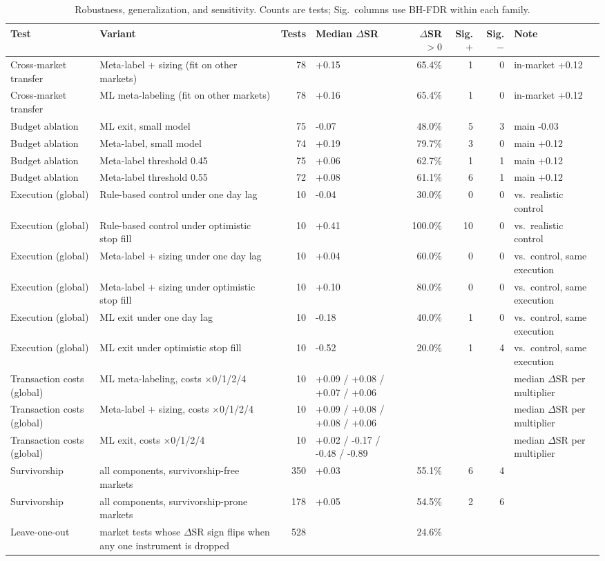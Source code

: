 \begin{longtable}{p{2.4cm} p{4.2cm} r l r r r p{2.4cm}}
\caption{Robustness, generalization, and sensitivity. Counts are tests; Sig.\ columns use BH-FDR within each family.} \label{tab:s2robust} \\
\toprule
Test & Variant & Tests & Median $\Delta$SR & $\Delta$SR$>0$ & Sig.$+$ & Sig.$-$ & Note \\
\midrule
\endhead
\bottomrule
\endfoot
Cross-market transfer & Meta-label + sizing (fit on other markets) & 78 & +0.15 & 65.4\% & 1 & 0 & in-market +0.12 \\
Cross-market transfer & ML meta-labeling (fit on other markets) & 78 & +0.16 & 65.4\% & 1 & 0 & in-market +0.12 \\
Budget ablation & ML exit, small model & 75 & -0.07 & 48.0\% & 5 & 3 & main -0.03 \\
Budget ablation & Meta-label, small model & 74 & +0.19 & 79.7\% & 3 & 0 & main +0.12 \\
Budget ablation & Meta-label threshold 0.45 & 75 & +0.06 & 62.7\% & 1 & 1 & main +0.12 \\
Budget ablation & Meta-label threshold 0.55 & 72 & +0.08 & 61.1\% & 6 & 1 & main +0.12 \\
Execution (global) & Rule-based control under one day lag & 10 & -0.04 & 30.0\% & 0 & 0 & vs.\ realistic control \\
Execution (global) & Rule-based control under optimistic stop fill & 10 & +0.41 & 100.0\% & 10 & 0 & vs.\ realistic control \\
Execution (global) & Meta-label + sizing under one day lag & 10 & +0.04 & 60.0\% & 0 & 0 & vs.\ control, same execution \\
Execution (global) & Meta-label + sizing under optimistic stop fill & 10 & +0.10 & 80.0\% & 0 & 0 & vs.\ control, same execution \\
Execution (global) & ML exit under one day lag & 10 & -0.18 & 40.0\% & 1 & 0 & vs.\ control, same execution \\
Execution (global) & ML exit under optimistic stop fill & 10 & -0.52 & 20.0\% & 1 & 4 & vs.\ control, same execution \\
Transaction costs (global) & ML meta-labeling, costs $\times$0/1/2/4 & 10 & +0.09 / +0.08 / +0.07 / +0.06 &  &  &  & median $\Delta$SR per multiplier \\
Transaction costs (global) & Meta-label + sizing, costs $\times$0/1/2/4 & 10 & +0.09 / +0.08 / +0.08 / +0.06 &  &  &  & median $\Delta$SR per multiplier \\
Transaction costs (global) & ML exit, costs $\times$0/1/2/4 & 10 & +0.02 / -0.17 / -0.48 / -0.89 &  &  &  & median $\Delta$SR per multiplier \\
Survivorship & all components, survivorship-free markets & 350 & +0.03 & 55.1\% & 6 & 4 &  \\
Survivorship & all components, survivorship-prone markets & 178 & +0.05 & 54.5\% & 2 & 6 &  \\
Leave-one-out & market tests whose $\Delta$SR sign flips when any one instrument is dropped & 528 &  & 24.6\% &  &  &  \\
\end{longtable}
